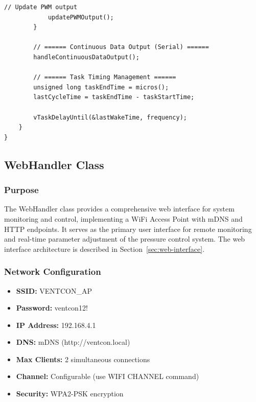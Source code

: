 \begin{lstlisting}[caption=Control Loop Implementation - Actual Code from ControlSystem.cpp]
            // Update PWM output
            updatePWMOutput();
        }
        
        // ====== Continuous Data Output (Serial) ======
        handleContinuousDataOutput();
        
        // ====== Task Timing Management ======
        unsigned long taskEndTime = micros();
        lastCycleTime = taskEndTime - taskStartTime;
        
        vTaskDelayUntil(&lastWakeTime, frequency);
    }
}
\end{lstlisting}

\subsection{WebHandler Class}

\subsubsection{Purpose}
The WebHandler class provides a comprehensive web interface for system monitoring and control, implementing a WiFi Access Point with mDNS and HTTP endpoints. It serves as the primary user interface for remote monitoring and real-time parameter adjustment of the pressure control system. The web interface architecture is described in Section~\ref{sec:web-interface}.

\subsubsection{Network Configuration}
\begin{itemize}
    \item \textbf{SSID:} VENTCON\_AP
    \item \textbf{Password:} ventcon12!
    \item \textbf{IP Address:} 192.168.4.1
    \item \textbf{DNS:} mDNS (http://ventcon.local)
    \item \textbf{Max Clients:} 2 simultaneous connections
    \item \textbf{Channel:} Configurable (use WIFI CHANNEL command)
    \item \textbf{Security:} WPA2-PSK encryption
\end{itemize}

